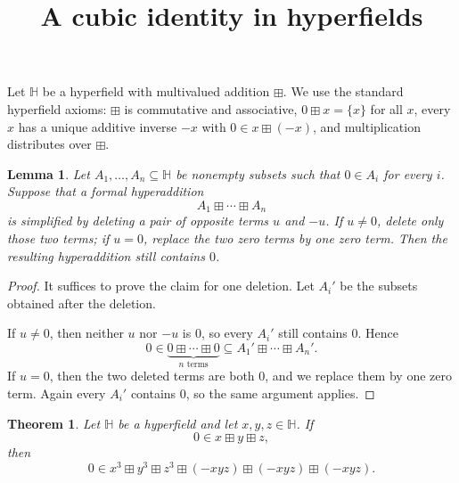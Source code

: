 \documentclass{article}
\newtheorem{lemma}{Lemma}
\newtheorem{theorem}{Theorem}
\theoremstyle{remark}
\begin{document}
\title{A cubic identity in hyperfields}
\author{}
\date{}

\maketitle

Let $\mathbb{H}$ be a hyperfield with multivalued addition $\boxplus$. 
We use the standard hyperfield axioms: $\boxplus$ is commutative and associative, 
$0\boxplus x=\{x\}$ for all $x$, every $x$ has a unique additive inverse $-x$ with 
$0\in x\boxplus(-x)$, and multiplication distributes over $\boxplus$.

\begin{lemma}
\label{lem:zero-preservation}
Let $A_1,\dots,A_n\subseteq \mathbb{H}$ be nonempty subsets such that $0\in A_i$ 
for every $i$. Suppose that a formal hyperaddition
\[
A_1\boxplus \cdots \boxplus A_n
\]
is simplified by deleting a pair of opposite terms $u$ and $-u$. 
If $u\neq 0$, delete only those two terms; if $u=0$, replace the two zero terms 
by one zero term. Then the resulting hyperaddition still contains $0$.
\end{lemma}

\begin{proof}
It suffices to prove the claim for one deletion. Let $A_i'$ be the subsets 
obtained after the deletion.

If $u\neq 0$, then neither $u$ nor $-u$ is $0$, so every $A_i'$ still contains 
$0$. Hence
\[
0\in \underbrace{0\boxplus\cdots\boxplus 0}_{n\text{ terms}}
\subseteq A_1'\boxplus\cdots\boxplus A_n'.
\]
If $u=0$, then the two deleted terms are both $0$, and we replace them by one 
zero term. Again every $A_i'$ contains $0$, so the same argument applies.
\end{proof}

\begin{theorem}
\label{thm:cubic}
Let $\mathbb{H}$ be a hyperfield and let $x,y,z\in \mathbb{H}$. If
\[
0\in x\boxplus y\boxplus z,
\]
then
\[
0\in x^3\boxplus y^3\boxplus z^3\boxplus (-xyz)\boxplus (-xyz)\boxplus (-xyz).
\]
\end{theorem}
\end{document}
